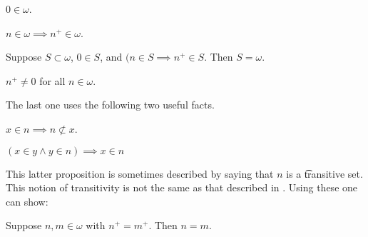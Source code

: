 \begin{proposition}
$0 \in \omega$.
\end{proposition}

\begin{proposition}
$n \in \omega \implies n^+ \in \omega$.
\end{proposition}

\begin{proposition}
Suppose $S \subset \omega$, $0 \in S$, and $(n \in S \implies n^+ \in S$.
Then $S = \omega$.
\end{proposition}

\begin{proposition}
$n^+ \neq 0$ for all $n \in \omega$.
\end{proposition}

The last one uses the following two useful facts.

\begin{proposition}
$x \in n \implies n \not\subset x$.
\end{proposition}

\begin{proposition}
$(x \in y \land y \in n) \implies x \in n$
\end{proposition}

This latter proposition is sometimes described by saying that $n$ is a \t{transitive set}.
This notion of transitivity is not the same as that described in .
Using these one can show:

\begin{proposition}
Suppose $n, m \in \omega$ with $n^+ = m^+$.
Then $n = m$.
\end{proposition}
